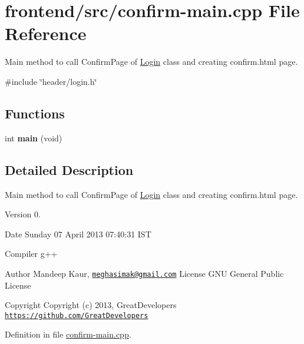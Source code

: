 \hypertarget{confirm-main_8cpp}{\section{frontend/src/confirm-\/main.cpp \-File \-Reference}
\label{d4/df0/confirm-main_8cpp}
}


\-Main method to call \-Confirm\-Page of \hyperlink{classLogin}{\-Login} class and creating confirm.\-html page.  


{\ttfamily \#include \char`\"{}header/login.\-h\char`\"{}}\*
\subsection*{\-Functions}
\begin{DoxyCompactItemize}
\item 
\hypertarget{confirm-main_8cpp_a840291bc02cba5474a4cb46a9b9566fe}{int {\bfseries main} (void)}\label{d4/df0/confirm-main_8cpp_a840291bc02cba5474a4cb46a9b9566fe}

\end{DoxyCompactItemize}


\subsection{\-Detailed \-Description}
\-Main method to call \-Confirm\-Page of \hyperlink{classLogin}{\-Login} class and creating confirm.\-html page. \begin{DoxyVersion}{\-Version}
0. 
\end{DoxyVersion}
\begin{DoxyDate}{\-Date}
\-Sunday 07 \-April 2013 07\-:40\-:31 \-I\-S\-T\par
 \-Compiler g++
\end{DoxyDate}
\begin{DoxyAuthor}{\-Author}
\-Mandeep \-Kaur, \href{mailto:meghasimak@gmail.com}{\tt meghasimak@gmail.\-com} \-License \-G\-N\-U \-General \-Public \-License 
\end{DoxyAuthor}
\begin{DoxyCopyright}{\-Copyright}
\-Copyright (c) 2013, \-Great\-Developers \href{https://github.com/GreatDevelopers}{\tt https\-://github.\-com/\-Great\-Developers} 
\end{DoxyCopyright}


\-Definition in file \hyperlink{confirm-main_8cpp_source}{confirm-\/main.\-cpp}.

